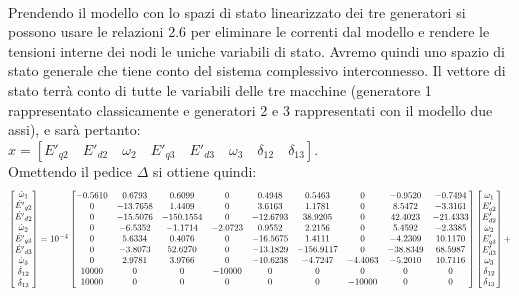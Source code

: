 \documentclass[Lau,noexaminfo]{sapthesis}
\begin{document}
	\\
	Prendendo il modello con lo spazi di stato linearizzato dei tre generatori si possono usare le relazioni 2.6 per eliminare le correnti dal modello e rendere le tensioni interne dei nodi le uniche variabili di stato. Avremo quindi uno spazio di stato generale che tiene conto del sistema complessivo interconnesso. Il vettore di stato terrà conto di tutte le variabili delle tre macchine (generatore 1 rappresentato classicamente e generatori 2 e 3 rappresentati con il modello due assi), e sarà pertanto:\\
	$x=[E'_{q2} \quad E'_{d2} \quad \omega_2 \quad E'_{q3} \quad E'_{d3} \quad \omega_3 \quad \delta_{12} \quad \delta_{13}]$.\\
	\newpage
	Omettendo il pedice $\Delta$ si ottiene quindi:\\
	\begin{equation*}
	\centering
	\resizebox{1.2\hsize}{!}{$%
	\begin{bmatrix}
	\dot{\omega}_1\\
	\dot{E'}_{q2}\\
	\dot{E'}_{d2}\\
	\dot{\omega}_2\\
	\dot{E'}_{q3}\\
	\dot{E'}_{d3}\\
	\dot{\omega}_3\\
	\dot{\delta}_{12}\\
	\dot{\delta}_{13}
	\end{bmatrix}=10^{-4}
	\begin{bmatrix}
	-0.5610 & 0.6793 & 0.6099 & 0 & 0.4948 & 0.5463 & 0 & -0.9520 & -0.7494\\
	0 & -13.7658 & 1.4409 & 0 & 3.6163 & 1.1781 & 0 & 8.5472 & -3.3161\\
	0 & -15.5076 & -150.1554 & 0 & -12.6793 & 38.9205 & 0 & 42.4023 & -21.4333\\
	0 & -6.5352 & -1.1714 & -2.0723 & 0.9552 & 2.2156 & 0 & 5.4592 & -2.3385\\
	0 & 5.6334 & 0.4076 & 0 & -16.5675 & 1.4111 & 0 & -4.2309 & 10.1170\\
	0 & -3.8073 & 52.6270 & 0 & -13.1829 & -156.9117 & 0 & -38.8349 & 68.5987\\
	0 & 2.9781 & 3.9766 & 0 & -10.6238 & -4.7247 & -4.4063 & -5.2010 & 10.7116\\
	10000 & 0 & 0 & -10000 & 0 & 0 & 0 & 0 & 0\\
	10000 & 0 & 0 & 0 & 0 & 0 & -10000 & 0 & 0
	\end{bmatrix}
	\begin{bmatrix}
	\omega_1\\
	E'_{q2}\\
	E'_{d2}\\
	\omega_2\\
	E'_{q3}\\
	E'_{d3}\\
	\omega_3\\
	\delta_{12}\\
	\delta_{13}
	\end{bmatrix}+$%
	}%
	\end{equation*}
\end{document}
